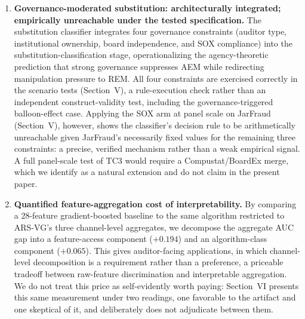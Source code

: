 \documentclass[12pt]{article}
\begin{document}
\begin{enumerate}
    \item[\textbf{TC3}] \textbf{Governance-moderated substitution:
    architecturally integrated; empirically unreachable under the
    tested specification.}
    The substitution classifier integrates four governance constraints
    (auditor type, institutional ownership, board independence, and
    SOX compliance) into the substitution-classification stage,
    operationalizing the agency-theoretic prediction \citep{jensen1976}
    that strong governance suppresses AEM while redirecting
    manipulation pressure to REM.  All four constraints are exercised
    correctly in the scenario tests (Section~V), a rule-execution
    check rather than an independent construct-validity test, including
    the governance-triggered balloon-effect case.  Applying the SOX arm at
    panel scale on JarFraud (Section~V), however, shows the
    classifier's decision rule to be arithmetically unreachable given
    JarFraud's necessarily fixed values for the remaining three
    constraints: a precise, verified mechanism rather than a weak
    empirical signal.  A full panel-scale test of TC3 would require a
    Compustat/BoardEx merge, which we identify as a natural extension
    and do not claim in the present paper.

    \item[\textbf{TC4}] \textbf{Quantified feature-aggregation cost of
    interpretability.}  By comparing a 28-feature gradient-boosted baseline
    \citep{bao2020} to the same algorithm restricted to ARS-VG's three
    channel-level aggregates, we decompose the aggregate AUC gap into a
    feature-access component ($+0.194$) and an algorithm-class component
    ($+0.065$).  This gives auditor-facing applications, in which
    channel-level decomposition is a requirement rather than a preference,
    a priceable tradeoff between raw-feature discrimination and
    interpretable aggregation.  We do not treat this price as
    self-evidently worth paying: Section~VI presents this same
    measurement under two readings, one favorable to the artifact and
    one skeptical of it, and deliberately does not adjudicate between
    them.


\end{enumerate}
\end{document}
